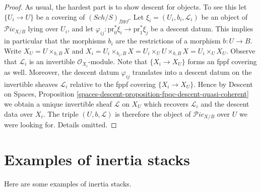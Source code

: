 \documentclass{stacks-project}
\theoremstyle{plain}
\theoremstyle{definition}
\theoremstyle{remark}
\numberwithin{equation}{subsection}
\def\Sch{\mathit{Sch}}
\def\Picardstack{\mathcal{P}\!\mathit{ic}}
\begin{document}
\begin{proof}
As usual, the hardest part is to show descent for objects.
To see this let $\{U_i \to U\}$ be a covering of $(\Sch/S)_{fppf}$.
Let $\xi_i = (U_i, b_i, \mathcal{L}_i)$ be an object of
$\Picardstack_{X/B}$ lying over $U_i$, and let
$\varphi_{ij} : \text{pr}_0^*\xi_i \to \text{pr}_1^*\xi_j$
be a descent datum. This implies in particular that the morphisms
$b_i$ are the restrictions of a morphism $b : U \to B$.
Write $X_U = U \times_{b, B} X$ and
$X_i = U_i \times_{b_i, B} X =
U_i \times_U U \times_{b, B} X = U_i \times_U X_U$.
Observe that $\mathcal{L}_i$ is an invertible $\mathcal{O}_{X_i}$-module.
Note that $\{X_i \to X_U\}$ forms an fppf covering as well.
Moreover, the descent datum $\varphi_{ij}$ translates into a
descent datum on the invertible sheaves $\mathcal{L}_i$ relative
to the fppf covering $\{X_i \to X_U\}$.
Hence by
Descent on Spaces,
Proposition \ref{spaces-descent-proposition-fpqc-descent-quasi-coherent}
we obtain a unique invertible sheaf $\mathcal{L}$ on $X_U$
which recovers $\mathcal{L}_i$ and the descent data over $X_i$.
The triple $(U, b, \mathcal{L})$ is therefore the object of
$\Picardstack_{X/B}$ over $U$ we were looking for.
Details omitted.
\end{proof}





\section{Examples of inertia stacks}
\label{section-examples-inertia}

\noindent
Here are some examples of inertia stacks.
\end{document}
